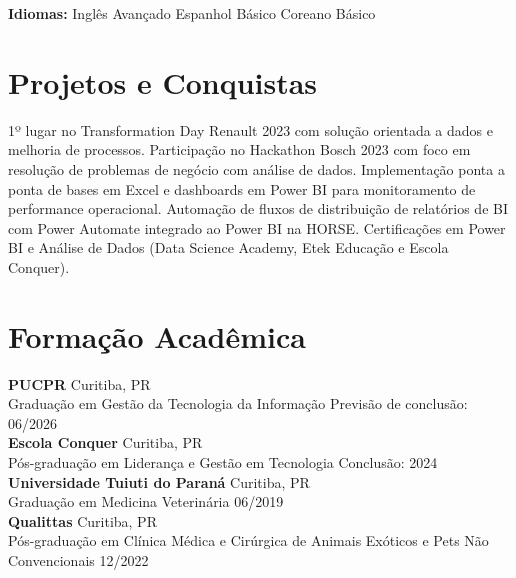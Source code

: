\documentclass[11pt,a4paper]{article}
\begin{document}
\textbf{Idiomas:} Inglês Avançado \enspace\textbullet\enspace Espanhol Básico \enspace\textbullet\enspace Coreano Básico

\section{Projetos e Conquistas}

1º lugar no Transformation Day Renault 2023 com solução orientada a dados e melhoria de processos. Participação no Hackathon Bosch 2023 com foco em resolução de problemas de negócio com análise de dados. Implementação ponta a ponta de bases em Excel e dashboards em Power BI para monitoramento de performance operacional. Automação de fluxos de distribuição de relatórios de BI com Power Automate integrado ao Power BI na HORSE. Certificações em Power BI e Análise de Dados (Data Science Academy, Etek Educação e Escola Conquer).

\section{Formação Acadêmica}

\textbf{PUCPR} \hfill Curitiba, PR\\
Graduação em Gestão da Tecnologia da Informação \hfill Previsão de conclusão: 06/2026\\[6pt]

\textbf{Escola Conquer} \hfill Curitiba, PR\\
Pós-graduação em Liderança e Gestão em Tecnologia \hfill Conclusão: 2024\\[6pt]

\textbf{Universidade Tuiuti do Paraná} \hfill Curitiba, PR\\
Graduação em Medicina Veterinária \hfill 06/2019\\[6pt]

\textbf{Qualittas} \hfill Curitiba, PR\\
Pós-graduação em Clínica Médica e Cirúrgica de Animais Exóticos e Pets Não Convencionais \hfill 12/2022
\end{document}
